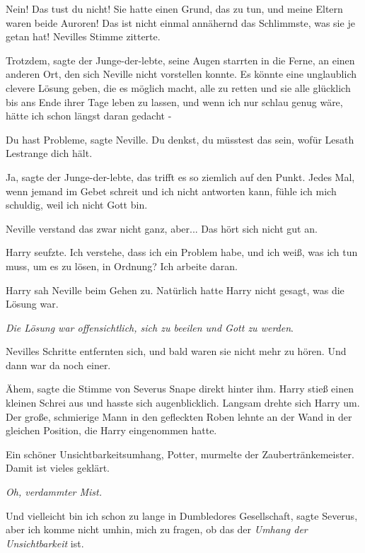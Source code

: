 \glqq{}Nein! Das tust du nicht! Sie hatte einen Grund, das zu tun, und meine
Eltern waren beide Auroren! Das ist nicht einmal annähernd das Schlimmste, was
sie je getan hat!\grqq{} Nevilles Stimme zitterte.

\glqq{}Trotzdem\grqq{}, sagte der Junge-der-lebte, seine Augen starrten in die
Ferne, an einen anderen Ort, den sich Neville nicht vorstellen konnte. \glqq{}Es
könnte eine unglaublich clevere Lösung geben, die es möglich macht, alle zu
retten und sie alle glücklich bis ans Ende ihrer Tage leben zu lassen, und wenn
ich nur schlau genug wäre, hätte ich schon längst daran gedacht -\grqq{}

\glqq{}Du hast Probleme\grqq{}, sagte Neville. \glqq{}Du denkst, du müsstest das
sein, wofür Lesath Lestrange dich hält.\grqq{}

\glqq{}Ja\grqq{}, sagte der Junge-der-lebte, \glqq{}das trifft es so ziemlich auf
den Punkt. Jedes Mal, wenn jemand im Gebet schreit und ich nicht antworten kann,
fühle ich mich schuldig, weil ich nicht Gott bin.\grqq{}

Neville verstand das zwar nicht ganz, aber... \glqq{}Das hört sich nicht gut
an.\grqq{}

Harry seufzte. \glqq{}Ich verstehe, dass ich ein Problem habe, und ich weiß, was
ich tun muss, um es zu lösen, in Ordnung? Ich arbeite daran.\grqq{}

Harry sah Neville beim Gehen zu. Natürlich hatte Harry nicht gesagt, was die
Lösung war.

\emph{Die Lösung war offensichtlich, sich zu beeilen und Gott zu werden}.

Nevilles Schritte entfernten sich, und bald waren sie nicht mehr zu hören. Und
dann war da noch einer.

\glqq{}Ähem\grqq{}, sagte die Stimme von Severus Snape direkt hinter ihm. Harry
stieß einen kleinen Schrei aus und hasste sich augenblicklich. Langsam drehte
sich Harry um. Der große, schmierige Mann in den gefleckten Roben lehnte an der
Wand in der gleichen Position, die Harry eingenommen hatte.

\glqq{}Ein schöner Unsichtbarkeitsumhang, Potter\grqq{}, murmelte der
Zaubertränkemeister. \glqq{}Damit ist vieles geklärt.\grqq{}

\emph{Oh, verdammter Mist.}

\glqq{}Und vielleicht bin ich schon zu lange in Dumbledores Gesellschaft\grqq{},
sagte Severus, \glqq{}aber ich komme nicht umhin, mich zu fragen, ob das der
\emph{Umhang der Unsichtbarkeit} ist.\grqq{}

